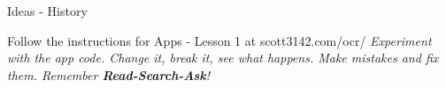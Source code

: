 \documentclass[10pt]{beamer}
\begin{document}
\begin{frame}{Ideas - History}
	\begin{tcolorbox}[title=Experimenting with Exisiting Apps (20 mins)]
		Follow the instructions for Apps - Lesson 1 at scott3142.com/ocr/
		\tcblower
		\textit{Experiment with the app code. Change it, break it, see what happens. Make mistakes and fix them. Remember \textbf{Read-Search-Ask}!}
	\end{tcolorbox}
\end{frame}
\end{document}
